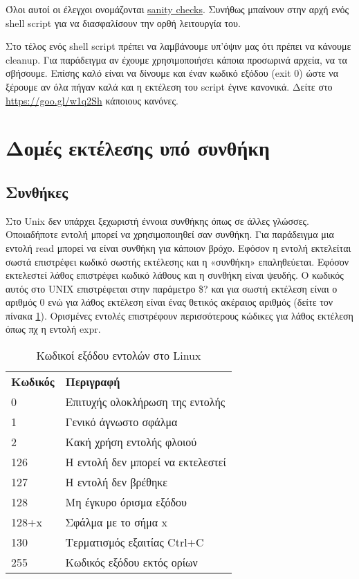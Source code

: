 Όλοι αυτοί οι έλεγχοι ονομάζονται  \href{https://goo.gl/8VEsf5}{sanity checks}.
Συνήθως μπαίνουν στην αρχή ενός shell script για να διασφαλίσουν την ορθή λειτουργία του.

Στο τέλος ενός shell script πρέπει να λαμβάνουμε υπ'όψιν μας ότι πρέπει να κάνουμε cleanup. Για παράδειγμα αν έχουμε χρησιμοποιήσει κάποια προσωρινά αρχεία, να τα σβήσουμε.
Επίσης καλό είναι να δίνουμε και έναν κωδικό εξόδου (exit 0) ώστε να ξέρουμε αν όλα πήγαν καλά και η εκτέλεση του script έγινε κανονικά. 
Δείτε στο \href{https://goo.gl/w1q2Sh}{https://goo.gl/w1q2Sh} κάποιους κανόνες.


\section*{Δομές εκτέλεσης υπό συνθήκη}

\subsection*{Συνθήκες}

Στο Unix δεν υπάρχει ξεχωριστή έννοια συνθήκης όπως σε άλλες γλώσσες.
Οποιαδήποτε εντολή μπορεί να χρησιμοποιηθεί σαν συνθήκη. Για παράδειγμα μια εντολή read μπορεί να είναι συνθήκη για κάποιον βρόχο. Εφόσον η εντολή εκτελείται σωστά επιστρέφει κωδικό σωστής εκτέλεσης και η «συνθήκη» επαληθεύεται. Εφόσον εκτελεστεί λάθος επιστρέφει κωδικό λάθους και η συνθήκη είναι ψευδής. Ο κωδικός αυτός στο UNIX επιστρέφεται στην παράμετρο \$? και για σωστή εκτέλεση είναι ο αριθμός 0 ενώ για λάθος εκτέλεση είναι ένας θετικός ακέραιος αριθμός (δείτε τον πίνακα \ref{tab:command_exit_codes}).
Ορισμένες εντολές επιστρέφουν περισσότερους κώδικες για λάθος εκτέλεση όπως πχ η εντολή expr.


\begin{center}
	\begin{table}[h]
		\small
		\begin{tabularx}{\columnwidth}{l|X}
			\rowcolor[gray]{0.9}
			\textbf{Κωδικός} & \textbf{Περιγραφή} \\
			0  &  Επιτυχής ολοκλήρωση της εντολής \\
			1  &  Γενικό άγνωστο σφάλμα \\
			2  &  Κακή χρήση εντολής φλοιού \\
			126  &  Η εντολή δεν μπορεί να εκτελεστεί \\
			127  &  Η εντολή δεν βρέθηκε \\
			128  &  Μη έγκυρο όρισμα εξόδου \\
			128+x  &  Σφάλμα με το σήμα x \\
			130  &  Τερματισμός εξαιτίας Ctrl+C \\									
			255  & Κωδικός εξόδου εκτός ορίων \\																					
		\end{tabularx}  
		\caption{Κωδικοί εξόδου εντολών στο Linux} 
		\label{tab:command_exit_codes}          
	\end{table}
\end{center}

